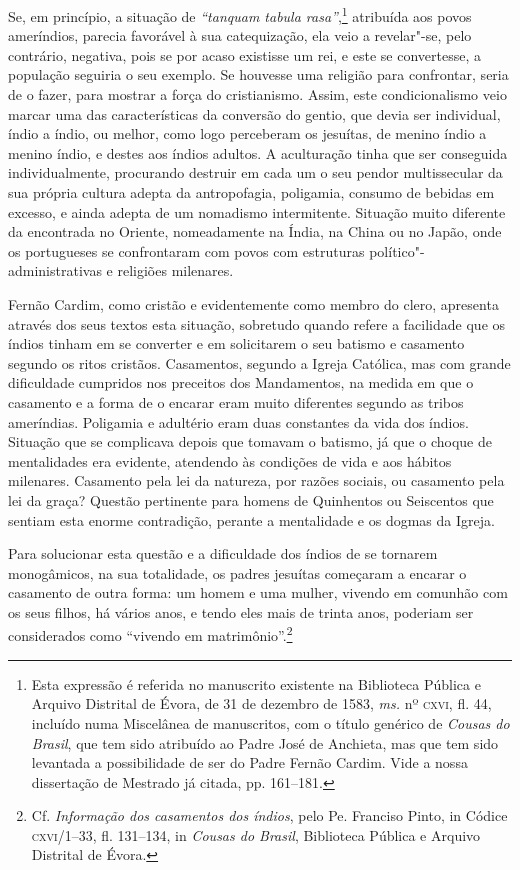 Se, em princípio, a situação de \textit{``tanquam tabula rasa''},\footnote{ Esta 
expressão é referida no manuscrito existente
na Biblioteca Pública e Arquivo Distrital de Évora, de 31 de dezembro
de 1583, \textit{ms.} nº \textsc{cxvi}, fl. 44, incluído numa Miscelânea de
manuscritos, com o título genérico de \textit{Cousas do Brasil}, que
tem sido atribuído ao Padre José de Anchieta, mas que tem sido
levantada a possibilidade de ser do Padre Fernão Cardim. Vide a nossa
dissertação de Mestrado já citada, pp. 161--181.} atribuída
aos povos ameríndios, parecia favorável à sua catequização, ela veio a
revelar"-se, pelo contrário, negativa, pois se por acaso existisse um
rei, e este se convertesse, a população seguiria o seu exemplo. Se
houvesse uma religião para confrontar, seria de o fazer, para mostrar a
força do cristianismo. Assim, este condicionalismo veio marcar uma das
características da conversão do gentio, que devia ser individual, índio
a índio, ou melhor, como logo perceberam os jesuítas, de menino índio
a menino índio, e destes aos índios adultos. A aculturação tinha que
ser conseguida individualmente, procurando destruir em cada um o seu
pendor multissecular da sua própria cultura adepta da antropofagia,
poligamia, consumo de bebidas em excesso, e ainda adepta de um
nomadismo intermitente. Situação muito diferente da encontrada no
Oriente, nomeadamente na Índia, na China ou no Japão, onde os
portugueses se confrontaram com povos com estruturas
político"-administrativas e religiões milenares. 

Fernão Cardim, como cristão e evidentemente como membro do clero,
apresenta através dos seus textos esta situação, sobretudo quando
refere a facilidade que os índios tinham em se converter e em
solicitarem o seu batismo e casamento segundo os ritos cristãos.
Casamentos, segundo a Igreja Católica, mas com grande dificuldade
cumpridos nos preceitos dos Mandamentos, na medida em que o casamento e
a forma de o encarar eram muito diferentes segundo as tribos ameríndias.
Poligamia e adultério eram duas constantes da vida dos índios. Situação
que se complicava depois que tomavam o batismo, já que o choque de
mentalidades era evidente, atendendo às condições de vida e aos hábitos
milenares. Casamento pela lei da natureza, por razões sociais, ou
casamento pela lei da graça? Questão pertinente para homens de
Quinhentos ou Seiscentos que sentiam esta enorme contradição, perante
a mentalidade e os dogmas da Igreja.

Para solucionar esta questão e a dificuldade dos índios de se
tornarem monogâmicos, na sua totalidade, os padres jesuítas começaram a
encarar o casamento de outra forma: um homem e uma mulher, vivendo em
comunhão com os seus filhos, há vários anos, e tendo eles mais de trinta anos, 
poderiam ser considerados como ``vivendo em matrimônio''.\footnote{ Cf. \textit{Informação
dos casamentos dos índios}, pelo Pe. Franciso Pinto, in Códice
\textsc{cxvi}/1--33, fl. 131--134, in \textit{Cousas do Brasil}, Biblioteca
Pública e Arquivo Distrital de Évora.} 

